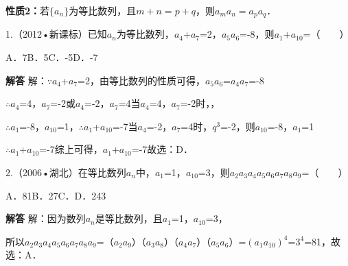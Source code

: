 \par\medskip\noindent\textbf{性质2：}若$\{a_n\}$为等比数列，且$m+n=p+q$，则$a_ma_n=a_pa_q$．\par
{}
1.（2012•新课标）已知{\ensuremath{a_{n}}}为等比数列，\ensuremath{a_{4}}+\ensuremath{a_{7}}=2，\ensuremath{a_{5}}\ensuremath{a_{6}}=-8，则\ensuremath{a_{1}}+\ensuremath{a_{10}}=（　　）\par
\qquad{}\qquad{}\qquad{}A．7\qquad{}B．5\qquad{}C．-5\qquad{}D．-7\qquad{}\par
\QuestionSpace{1.2cm}
\ifshowanswers
\par\begingroup\color{solutioncolor}\noindent\textbf{解答}\quad
解：\ensuremath{\because}\ensuremath{a_{4}}+\ensuremath{a_{7}}=2，由等比数列的性质可得，\ensuremath{a_{5}}\ensuremath{a_{6}}=\ensuremath{a_{4}}\ensuremath{a_{7}}=-8\par
\ensuremath{\therefore}\ensuremath{a_{4}}=4，\ensuremath{a_{7}}=-2或\ensuremath{a_{4}}=-2，\ensuremath{a_{7}}=4当\ensuremath{a_{4}}=4，\ensuremath{a_{7}}=-2时，，\par
\ensuremath{\therefore}\ensuremath{a_{1}}=-8，\ensuremath{a_{10}}=1，\ensuremath{\therefore}\ensuremath{a_{1}}+\ensuremath{a_{10}}=-7当\ensuremath{a_{4}}=-2，\ensuremath{a_{7}}=4时，\ensuremath{q^{3}}=-2，则\ensuremath{a_{10}}=-8，\ensuremath{a_{1}}=1\par
\ensuremath{\therefore}\ensuremath{a_{1}}+\ensuremath{a_{10}}=-7综上可得，\ensuremath{a_{1}}+\ensuremath{a_{10}}=-7故选：D．\par
\par\endgroup\fi

2.（2006•湖北）在等比数列{\ensuremath{a_{n}}}中，\ensuremath{a_{1}}=1，\ensuremath{a_{10}}=3，则\ensuremath{a_{2}}\ensuremath{a_{3}}\ensuremath{a_{4}}\ensuremath{a_{5}}\ensuremath{a_{6}}\ensuremath{a_{7}}\ensuremath{a_{8}}\ensuremath{a_{9}}=（　　）\par
\qquad{}\qquad{}\qquad{}A．81\qquad{}B．27\qquad{}C．\qquad{}D．243\qquad{}\par
\QuestionSpace{1.2cm}
\ifshowanswers
\par\begingroup\color{solutioncolor}\noindent\textbf{解答}\quad
解：因为数列{\ensuremath{a_{n}}}是等比数列，且\ensuremath{a_{1}}=1，\ensuremath{a_{10}}=3，\par
所以\ensuremath{a_{2}}\ensuremath{a_{3}}\ensuremath{a_{4}}\ensuremath{a_{5}}\ensuremath{a_{6}}\ensuremath{a_{7}}\ensuremath{a_{8}}\ensuremath{a_{9}}=（\ensuremath{a_{2}}\ensuremath{a_{9}}）（\ensuremath{a_{3}}\ensuremath{a_{8}}）（\ensuremath{a_{4}}\ensuremath{a_{7}}）（\ensuremath{a_{5}}\ensuremath{a_{6}}）=\ensuremath{(a_{1}a_{10})^{4}}=\ensuremath{3^{4}}=81，故选：A．\par
\par\endgroup\fi

